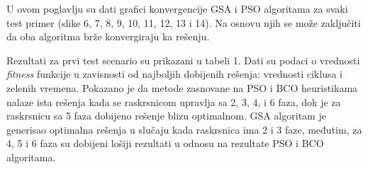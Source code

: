 U ovom poglavlju su dati grafici konvergencije GSA i PSO algoritama za svaki test primer (slike 6, 7, 8, 9, 10, 11, 12, 13 i 14). Na osnovu njih se može zaključiti da oba algoritma brže konvergiraju ka rešenju.

Rezultati za prvi test scenario su prikazani u tabeli 1. Dati su podaci o vrednosti \emph{fitness} funkcije u zavisnosti od najboljih dobijenih rešenja: vrednosti ciklusa i zelenih vremena. Pokazano je da metode zasnovane na PSO i BCO heuristikama nalaze ista rešenja kada se raskrsnicom upravlja sa 2, 3, 4, i 6 faza, dok je za raskrsnicu sa 5 faza dobijeno rešenje blizu optimalnom. GSA algoritam je generisao optimalna rešenja u slučaju kada raskrsnica ima 2 i 3 faze, međutim, za 4, 5 i 6 faza su dobijeni lošiji rezultati u odnosu na rezultate PSO i BCO algoritama. 





